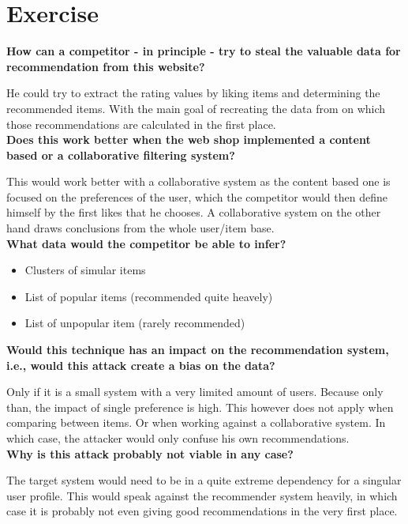 \section{Exercise}


\textbf{How can a competitor - in principle - try to steal the valuable data for
recommendation from this website?}

He could try to extract the rating values by liking items and determining the recommended items. With the
main goal of recreating the data from on which those recommendations are calculated in the first place. \\


\textbf{Does this work better when the web shop implemented a content based or a collaborative filtering system?}

This would work better with a collaborative system as the content based one is focused on the preferences of the user, which the competitor would then define himself by the first likes that he chooses. A collaborative system on the other hand draws conclusions from the whole user/item base. \\


\textbf{What data would the competitor be able to infer?}
\begin{itemize}
 \item Clusters of simular items 
 \item List of popular items (recommended quite heavely)
 \item List of unpopular item (rarely recommended)
\end{itemize}


\textbf{Would this technique has an impact on the recommendation system,
i.e., would this attack create a bias on the data?}

Only if it is a small system with a very limited amount of users. Because only than, the impact of single preference is high. This however does not apply when comparing between items. Or when working against a collaborative system. In which case, the attacker would only confuse his own recommendations. \\

\textbf{Why is this attack probably not viable in any case?}

The target system would need to be in a quite extreme dependency for a singular user profile. This would speak against the recommender system heavily, in which case it is probably not even giving good recommendations in the very first place.
